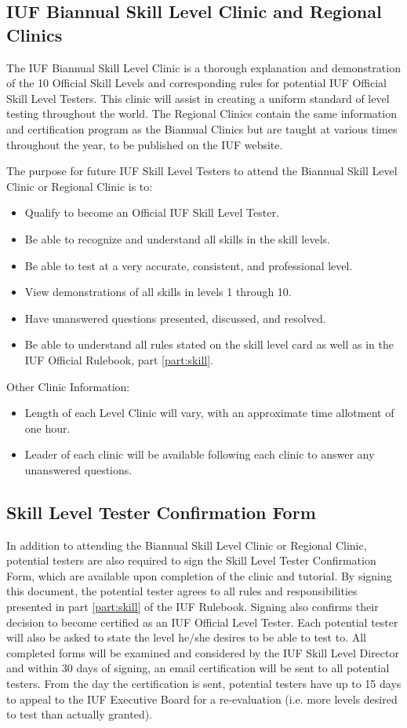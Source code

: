 \subsection{IUF Biannual Skill Level Clinic and Regional Clinics}
The IUF Biannual Skill Level Clinic is a thorough explanation and demonstration of the 10 Official Skill Levels and corresponding rules for potential IUF Official Skill Level Testers.
This clinic will assist in creating a uniform standard of level testing throughout the world.
The Regional Clinics contain the same information and certification program as the Biannual Clinics but are taught at various times throughout the year, to be published on the IUF website.

The purpose for future IUF Skill Level Testers to attend the Biannual Skill Level Clinic or Regional Clinic is to:
\begin{itemize}
\item Qualify to become an Official IUF Skill Level Tester.
\item Be able to recognize and understand all skills in the skill levels.
\item Be able to test at a very accurate, consistent, and professional level.
\item View demonstrations of all skills in levels 1 through 10.
\item Have unanswered questions presented, discussed, and resolved.
\item Be able to understand all rules stated on the skill level card as well as in the IUF Official Rulebook, part \ref{part:skill}.
\end{itemize}
Other Clinic Information:
\begin{itemize}
\item Length of each Level Clinic will vary, with an approximate time allotment of one hour.
\item Leader of each clinic will be available following each clinic to answer any unanswered questions.
\end{itemize}

\subsection{Skill Level Tester Confirmation Form}
In addition to attending the Biannual Skill Level Clinic or Regional Clinic, potential testers are also required to sign the Skill Level Tester Confirmation Form, which are available upon completion of the clinic and tutorial.
By signing this document, the potential tester agrees to all rules and responsibilities presented in part \ref{part:skill} of the IUF Rulebook.
Signing also confirms their decision to become certified as an IUF Official Level Tester.
Each potential tester will also be asked to state the level he/she desires to be able to test to.
All completed forms will be examined and considered by the IUF Skill Level Director and within 30 days of signing, an email certification will be sent to all potential testers.
From the day the certification is sent, potential testers have up to 15 days to appeal to the IUF Executive Board for a re-evaluation (i.e. more levels desired to test than actually granted).

